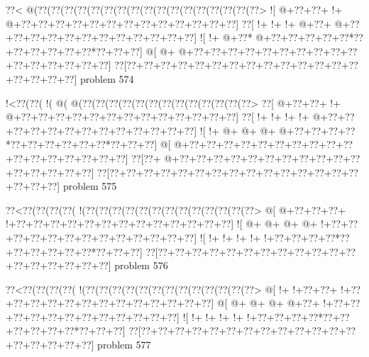 \vbox{\vbox{\goo
\0??<\- @(\0??(\0??(\0??(\0??(\0??(\0??(\0??(\0??(\0??(\0??(\0??(\0??(\0??(\0??(\0??(\0??(\0??>
\- ![\- @+\0??+\0??+\- !+\- @+\0??+\0??+\0??+\0??+\0??+\0??+\0??+\0??+\0??+\0??+\0??+\0??+\0??]
\0??[\- !+\- !+\- !+\- @+\0??+\- @+\0??+\0??+\0??+\0??+\0??+\0??+\0??+\0??+\0??+\0??+\0??+\0??]
\- ![\- !+\- @+\0??*\- @+\0??+\0??+\0??+\0??+\0??*\0??+\0??+\0??+\0??+\0??+\0??*\0??+\0??+\0??]
\- @[\- @+\- @+\0??+\0??+\0??+\0??+\0??+\0??+\0??+\0??+\0??+\0??+\0??+\0??+\0??+\0??+\0??+\0??]
\0??[\0??+\0??+\0??+\0??+\0??+\0??+\0??+\0??+\0??+\0??+\0??+\0??+\0??+\0??+\0??+\0??+\0??+\0??]
}
\hfil problem 574\hfil\break
}



\vbox{\vbox{\goo
\- !<\0??(\0??(\- !(\- @(\- @(\0??(\0??(\0??(\0??(\0??(\0??(\0??(\0??(\0??(\0??(\0??(\0??(\0??>
\0??[\- @+\0??+\0??+\- !+\- @+\0??+\0??+\0??+\0??+\0??+\0??+\0??+\0??+\0??+\0??+\0??+\0??+\0??]
\0??[\- !+\- !+\- !+\- !+\- @+\0??+\0??+\0??+\0??+\0??+\0??+\0??+\0??+\0??+\0??+\0??+\0??+\0??]
\- ![\- !+\- @+\- @+\- @+\- @+\0??+\0??+\0??+\0??*\0??+\0??+\0??+\0??+\0??+\0??*\0??+\0??+\0??]
\- @[\- @+\0??+\0??+\0??+\0??+\0??+\0??+\0??+\0??+\0??+\0??+\0??+\0??+\0??+\0??+\0??+\0??+\0??]
\0??[\0??+\- @+\0??+\0??+\0??+\0??+\0??+\0??+\0??+\0??+\0??+\0??+\0??+\0??+\0??+\0??+\0??+\0??]
\0??[\0??+\0??+\0??+\0??+\0??+\0??+\0??+\0??+\0??+\0??+\0??+\0??+\0??+\0??+\0??+\0??+\0??+\0??]
}
\hfil problem 575\hfil\break
}



\vbox{\vbox{\goo
\0??<\0??(\0??(\0??(\0??(\- !(\0??(\0??(\0??(\0??(\0??(\0??(\0??(\0??(\0??(\0??(\0??(\0??(\0??>
\- @[\- @+\0??+\0??+\0??+\- !+\0??+\0??+\0??+\0??+\0??+\0??+\0??+\0??+\0??+\0??+\0??+\0??+\0??]
\- ![\- @+\- @+\- @+\- @+\- !+\0??+\0??+\0??+\0??+\0??+\0??+\0??+\0??+\0??+\0??+\0??+\0??+\0??]
\- ![\- !+\- !+\- !+\- !+\- !+\0??+\0??+\0??+\0??*\0??+\0??+\0??+\0??+\0??+\0??*\0??+\0??+\0??]
\0??[\0??+\0??+\0??+\0??+\0??+\0??+\0??+\0??+\0??+\0??+\0??+\0??+\0??+\0??+\0??+\0??+\0??+\0??]
}
\hfil problem 576\hfil\break
}



\vbox{\vbox{\goo
\0??<\0??(\0??(\0??(\0??(\- !(\0??(\0??(\0??(\0??(\0??(\0??(\0??(\0??(\0??(\0??(\0??(\0??(\0??>
\- @[\- !+\- !+\0??+\0??+\- !+\0??+\0??+\0??+\0??+\0??+\0??+\0??+\0??+\0??+\0??+\0??+\0??+\0??]
\- @[\- @+\- @+\- @+\- @+\0??+\- !+\0??+\0??+\0??+\0??+\0??+\0??+\0??+\0??+\0??+\0??+\0??+\0??]
\- ![\- !+\- !+\- !+\- !+\- !+\0??+\0??+\0??+\0??*\0??+\0??+\0??+\0??+\0??+\0??*\0??+\0??+\0??]
\0??[\0??+\0??+\0??+\0??+\0??+\0??+\0??+\0??+\0??+\0??+\0??+\0??+\0??+\0??+\0??+\0??+\0??+\0??]
}
\hfil problem 577\hfil\break
}



